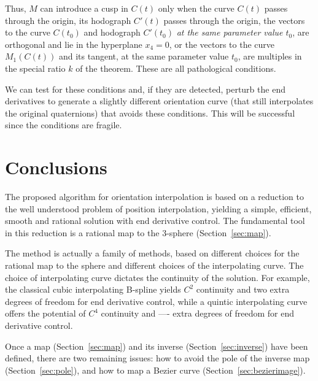 \documentclass[12pt]{article}
\begin{document}

Thus, $M$ can introduce a cusp in $C(t)$ only when the curve $C(t)$ passes through
the origin, its hodograph $C'(t)$ passes through the origin,
the vectors to the curve $C(t_0)$ and hodograph $C'(t_0)$ 
{\em at the same parameter value $t_0$}, are orthogonal and lie in the hyperplane $x_4=0$,
or the vectors to the
curve $M_1(C(t))$ and its tangent, at the same parameter value $t_0$, 
are multiples in the special ratio $k$ of the theorem.
These are all pathological conditions. %

We can test for these conditions and, if they are detected,
perturb the end derivatives to generate a slightly different orientation curve
(that still interpolates the original quaternions) that avoids these conditions.
This will be successful since the conditions are fragile.

\clearpage

\section{Conclusions}
\label{sec:conclude}

The proposed algorithm for orientation interpolation is based on a reduction 
to the well understood problem of position interpolation,
yielding a simple, efficient, smooth and rational solution with
end derivative control.
The fundamental tool in this reduction is a rational map to the 3-sphere 
(Section~\ref{sec:map}).

The method is actually a family of methods, based on different choices for
the rational map to the sphere and different choices of the interpolating curve.
The choice of interpolating curve dictates the continuity of the solution.
For example, the classical cubic interpolating B-spline yields $C^2$ continuity
and two extra degrees of freedom for end derivative control,
while a quintic interpolating curve offers the potential of $C^4$ continuity
and ---- extra degrees of freedom for end derivative control.

Once a map (Section~\ref{sec:map}) and its inverse (Section~\ref{sec:inverse}) 
have been defined, there are two remaining issues: 
how to avoid the pole of the inverse map (Section~\ref{sec:pole}),
and how to map a Bezier curve (Section~\ref{sec:bezierimage}).

\vspace{1in}
\end{document}
